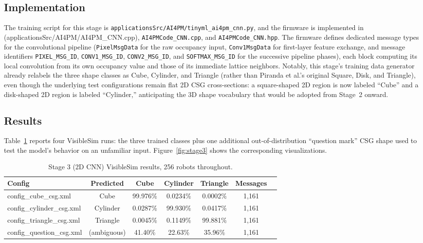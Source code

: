 \documentclass[12pt,a4paper]{report}
\begin{document}
\subsection*{Implementation}

The training script for this stage is \texttt{applicationsSrc/AI4PM/tinyml\_ai4pm\_cnn.py}, and the firmware is implemented in (applicationsSrc/AI4PM/AI4PM\_CNN.cpp), \texttt{AI4PMCode\_CNN.cpp}, and \texttt{AI4PMCode\_CNN.hpp}. The firmware defines dedicated message types for the convolutional pipeline (\texttt{PixelMsgData} for the raw occupancy input, \texttt{Conv1MsgData} for first-layer feature exchange, and message identifiers \texttt{PIXEL\_MSG\_ID}, \texttt{CONV1\_MSG\_ID}, \texttt{CONV2\_MSG\_ID}, and \texttt{SOFTMAX\_MSG\_ID} for the successive pipeline phases), each block computing its local convolution from its own occupancy value and those of its immediate lattice neighbors. Notably, this stage's training data generator already relabels the three shape classes as Cube, Cylinder, and Triangle (rather than Piranda et al.'s original Square, Disk, and Triangle), even though the underlying test configurations remain flat 2D CSG cross-sections: a square-shaped 2D region is now labeled ``Cube'' and a disk-shaped 2D region is labeled ``Cylinder,'' anticipating the 3D shape vocabulary that would be adopted from Stage~2 onward.

\subsection*{Results}

Table~\ref{tab:stage3-results} reports four VisibleSim runs: the three trained classes plus one additional out-of-distribution ``question mark'' CSG shape used to test the model's behavior on an unfamiliar input. Figure~\ref{fig:stage3} shows the corresponding visualizations.

\begin{table}[H]
    \centering
    \caption{Stage 3 (2D CNN) VisibleSim results, 256 robots throughout.}
    \label{tab:stage3-results}
    \begin{tabular}{lcccccc}
        \toprule
        Config & Predicted & Cube & Cylinder & Triangle & Messages \\
        \midrule
        config\_cube\_csg.xml     & Cube     & 99.976\% & 0.0234\% & 0.0002\% & 1,161 \\
        config\_cylinder\_csg.xml & Cylinder & 0.0287\% & 99.930\% & 0.0417\% & 1,161 \\
        config\_triangle\_csg.xml & Triangle & 0.0045\% & 0.1149\% & 99.881\% & 1,161 \\
        config\_question\_csg.xml & (ambiguous) & 41.40\% & 22.63\% & 35.96\% & 1,161 \\
        \bottomrule
    \end{tabular}
\end{table}
\end{document}
